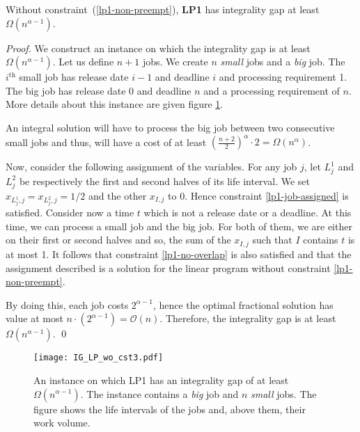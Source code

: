 \begin{lem}\label{lem:gap_lp1}
Without constraint~(\ref{lp1-non-preempt}), \textbf{LP1} has integrality gap at least $\Omega (n^{\alpha-1})$.
\end{lem}
\begin{proof}
We construct an instance on which the integrality gap is at least $\Omega (n^{\alpha -1})$.
Let us define $n+1$ jobs. We create $n$ \emph{small} jobs and a \emph{big} job.
The $i^{\text{th}}$ small job has release date $i-1$ and deadline $i$ and processing requirement 1.
The big job has release date 0 and deadline $n$ and a processing requirement of $n$.
More details about this instance are given figure \ref{fig:exmpl_LP}.

An integral solution will have to process the big job between two consecutive small jobs and thus,
will have a cost of at least $(\frac{n+2}{2})^{\alpha} \cdot 2 = \Omega (n^{\alpha})$.

Now, consider the following assignment of the variables. For any job $j$, let $L_j^1$ and $L_j^2$ be respectively the
first and second halves of its life interval.
We set $x_{L_j^1,j} = x_{L_j^2,j} = 1/2$ and the other $x_{I,j}$ to 0. Hence constraint \ref{lp1-job-assigned} is satisfied.
Consider now a time $t$ which is not a release date or a deadline. At this time, we can process a small job and the big job.
For both of them, we are either on their first or second halves and so, the sum of the $x_{I,j}$ such that $I$ contains $t$ is
at most 1. It follows that constraint \ref{lp1-no-overlap} is also satisfied and that the assignment described is a solution for
the linear program without constraint \ref{lp1-non-preempt}.

By doing this, each job costs $2^{\alpha -1}$, hence the optimal fractional solution has value at most $n \cdot (2^{\alpha -1}) = \mathcal{O}(n)$.
Therefore, the integrality gap is at least $\Omega (n^{\alpha -1})$.
\qed\end{proof}

\begin{figure}
   \begin{center}
        \texttt{[image: IG\_LP\_wo\_cst3.pdf]}
   \end{center}
   \caption{An instance on which LP1 has an integrality gap of at least $\Omega (n^{\alpha -1})$.
   The instance contains a \emph{big} job and $n$ \emph{small} jobs. The figure shows the life intervals of the jobs
   and, above them, their work volume.}
   \label{fig:exmpl_LP}
\end{figure}


